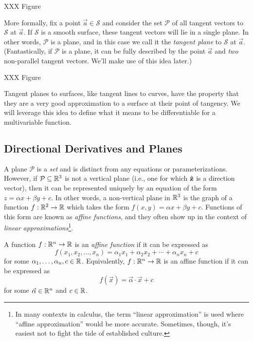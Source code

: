 XXX Figure

More formally, fix a point $\vec a\in\mathcal S$ and consider the set $\mathcal P$
of all tangent vectors to $\mathcal S$ at $\vec a$.  If $\mathcal S$ is a smooth
surface, these tangent vectors will lie in a single plane.  In other words,
$\mathcal P$ is a plane, and in this case we call it the 
\emph{tangent plane}
to $\mathcal S$ at $\vec a$.  (Fantastically, if $\mathcal P$ is a plane,
it can be fully described by the point $\vec a$ and \emph{two} non-parallel
tangent vectors.  We'll make use of this idea later.)

XXX Figure

Tangent planes to surfaces, like tangent lines to curves, have
the property that they are a very good approximation to a surface
at their point of tangency.  We will leverage this idea to 
define what it means to be differentiable for a multivariable function.

\subsection{Directional Derivatives and Planes}

A plane $\mathcal P$ is a \emph{set} and is distinct from any equations
or parameterizations.  However, if $\mathcal P\subseteq \mathbb{R}^3$ is not a vertical
plane (i.e., one for which ${\hat {\mathbf z}}$ is a direction vector), then it can be represented
uniquely by an equation of the form $z=\alpha x+\beta y+c$.  In other words,
a non-vertical plane in $\mathbb{R}^3$ is the graph of a function $f:\mathbb{R}^2\to\mathbb{R}$
which takes the form $f(x,y)=\alpha x+\beta y+c$.  Functions of this form
are known as \emph{affine functions}, and they
often show up in the context of \emph{linear approximations}\footnote{
	In many contexts in calculus, the term ``linear approximation'' is used
	where ``affine approximation'' would be more accurate.  Sometimes, though,
	it's easiest not to fight the tide of established culture.}.

\begin{definition}
	A function $f:\mathbb{R}^n\to\mathbb{R}$ is an \emph{affine function} if it can
	be expressed as
	\[
		f(x_1,x_2,\ldots,x_n) = \alpha_1x_1+\alpha_2x_2+\cdots+\alpha_nx_n +c
	\]
	for some $\alpha_1,\ldots,\alpha_n,c\in\mathbb{R}$.  Equivalently, $f:\mathbb{R}^n\to\mathbb{R}$ is
	an affine function if it can be expressed as
	\[
		f(\vec x)=\vec \alpha \cdot \vec x+c
	\]
	for some $\vec\alpha\in\mathbb{R}^n$ and $c\in \mathbb{R}$.
\end{definition}


